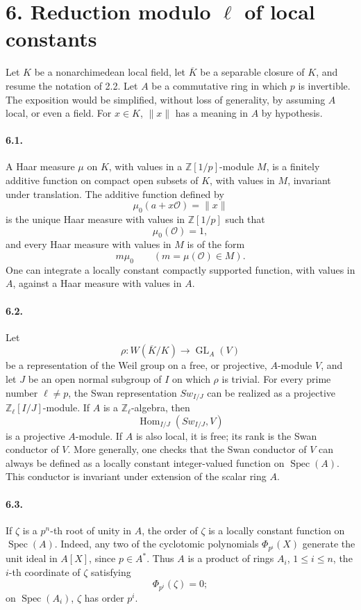 \documentclass[10pt,letterpaper]{article}
\newcommand{\GL}{\operatorname{GL}}
\newcommand{\Hom}{\operatorname{Hom}}
\newcommand{\Spec}{\operatorname{Spec}}
\providecommand{\Spec}{\operatorname{Spec}}
\providecommand{\Hom}{\operatorname{Hom}}
\providecommand{\GL}{\operatorname{GL}}
\providecommand{\GL}{\operatorname{GL}}
\providecommand{\Hom}{\operatorname{Hom}}
\providecommand{\Spec}{\operatorname{Spec}}
\providecommand{\Spec}{\operatorname{Spec}}
\providecommand{\Hom}{\operatorname{Hom}}
\begin{document}
\section*{6. Reduction modulo \(\ell\) of local constants}

Let \(K\) be a nonarchimedean local field, let \(\overline K\) be a separable closure of \(K\), and resume the notation of 2.2. Let \(A\) be a commutative ring in which \(p\) is invertible. The exposition would be simplified, without loss of generality, by assuming \(A\) local, or even a field. For \(x\in K\), \(\|x\|\) has a meaning in \(A\) by hypothesis.

\paragraph{6.1.} A Haar measure \(\mu\) on \(K\), with values in a \(\mathbb Z[1/p]\)-module \(M\), is a finitely additive function on compact open subsets of \(K\), with values in \(M\), invariant under translation. The additive function defined by
\[
\mu_0(a+x\mathcal O)=\|x\|
\]
is the unique Haar measure with values in \(\mathbb Z[1/p]\) such that
\[
\mu_0(\mathcal O)=1,
\]
and every Haar measure with values in \(M\) is of the form
\[
m\mu_0\qquad(m=\mu(\mathcal O)\in M).
\]
One can integrate a locally constant compactly supported function, with values in \(A\), against a Haar measure with values in \(A\).

\paragraph{6.2.} Let
\[
\rho:W(\overline K/K)\longrightarrow\GL_A(V)
\]
be a representation of the Weil group on a free, or projective, \(A\)-module \(V\), and let \(J\) be an open normal subgroup of \(I\) on which \(\rho\) is trivial. For every prime number \(\ell\ne p\), the Swan representation \(Sw_{I/J}\) can be realized as a projective \(\mathbb Z_\ell[I/J]\)-module. If \(A\) is a \(\mathbb Z_\ell\)-algebra, then
\[
\Hom_{I/J}(Sw_{I/J},V)
\]
is a projective \(A\)-module. If \(A\) is also local, it is free; its rank is the Swan conductor of \(V\). More generally, one checks that the Swan conductor of \(V\) can always be defined as a locally constant integer-valued function on \(\Spec(A)\). This conductor is invariant under extension of the scalar ring \(A\).

\paragraph{6.3.} If \(\zeta\) is a \(p^n\)-th root of unity in \(A\), the order of \(\zeta\) is a locally constant function on \(\Spec(A)\). Indeed, any two of the cyclotomic polynomials \(\Phi_{p^i}(X)\) generate the unit ideal in \(A[X]\), since \(p\in A^*\). Thus \(A\) is a product of rings \(A_i\), \(1\le i\le n\), the \(i\)-th coordinate of \(\zeta\) satisfying
\[
\Phi_{p^i}(\zeta)=0;
\]
on \(\Spec(A_i)\), \(\zeta\) has order \(p^i\).
\end{document}
